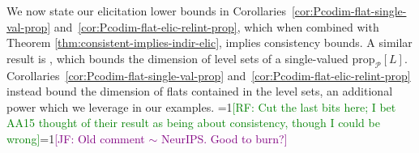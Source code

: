 \documentclass[anon,12pt]{colt2021} %
\newcommand{\Comments}{1}
\newcommand{\mynote}[2]{\ifnum\Comments=1\textcolor{#1}{#2}\fi}
\newcommand{\raf}[1]{\mynote{green}{[RF: #1]}}
\newcommand{\jessie}[1]{\mynote{purple}{[JF: #1]}}
\newcommand{\prop}[2][\mathcal{P}]{\mathrm{prop}_{#1}[#2]}
\begin{document}
We now state our elicitation lower bounds in Corollaries~\ref{cor:Pcodim-flat-single-val-prop} and~\ref{cor:Pcodim-flat-elic-relint-prop}, which when combined with Theorem \ref{thm:consistent-implies-indir-elic}, implies consistency bounds.
A similar result is \citet[Theorem 9]{agarwal2015consistent}, which bounds the dimension of level sets of a single-valued $\prop{L}$.
Corollaries~\ref{cor:Pcodim-flat-single-val-prop} and~\ref{cor:Pcodim-flat-elic-relint-prop} instead bound the dimension of flats contained in the level sets, an additional power which we leverage in our examples.
\raf{Cut the last bits here; I bet AA15 thought of their result as being about consistency, though I could be wrong}\jessie{Old comment $\sim$ NeurIPS.  Good to burn?} 
\end{document}
